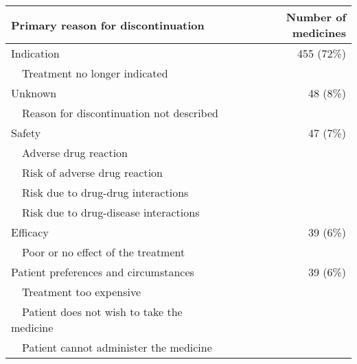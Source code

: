 \begin{table}[]
\begin{tabular}{@{}lr@{}}
\toprule
\textbf{Primary reason for discontinuation} & \textbf{Number of medicines}} \\ \midrule
Indication                                  & 455 (72\%)                                       \\
~~Treatment no longer indicated               &                                                  \\
Unknown                                     & 48 (8\%)                                         \\
~~Reason for discontinuation not described    &                                                  \\
Safety                                      & 47 (7\%)                                         \\
~~Adverse drug reaction                       &                                                  \\
~~Risk of adverse drug reaction               &                                                  \\
~~Risk due to drug-drug interactions          &                                                  \\
~~Risk due to drug-disease interactions       &                                                  \\
Efficacy                                    & 39 (6\%)                                         \\
~~Poor or no effect of the treatment          &                                                  \\
Patient preferences and circumstances       & 39 (6\%)                                         \\
~~Treatment too expensive                     &                                                  \\
~~Patient does not wish to take the medicine  &                                                  \\
~~Patient cannot administer the medicine      &                                                  \\ \bottomrule
\end{tabular}
\end{table}
